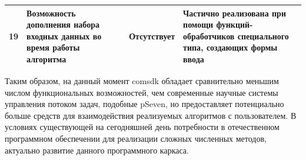 \begin{landscape}
\begin{longtable}{|c|p{}|p{}|p{}|}
    \hline
    19         & Возможность дополнения набора входных данных во время работы алгоритма                     & Отсутствует                                                                                                                                                                                                                                                                                                                                                                                                                                                                                                                                                                                                                                     & Частично реализована при помощи функций-обработчиков специального типа, создающих формы ввода                                                                                                                                                                                     \\
    \hline
  \end{longtable}
\end{landscape}

Таким образом, на данный момент comsdk обладает сравнительно меньшим числом функциональных возможностей, чем современные научные системы управления потоком задач, подобные pSeven, но предоставляет потенциально больше средств для взаимодействия реализуемых алгоритмов с пользователем. В условиях существующей на сегодняшней день потребности в отечественном программном обеспечении для реализации сложных численных методов, актуально развитие данного программного каркаса.